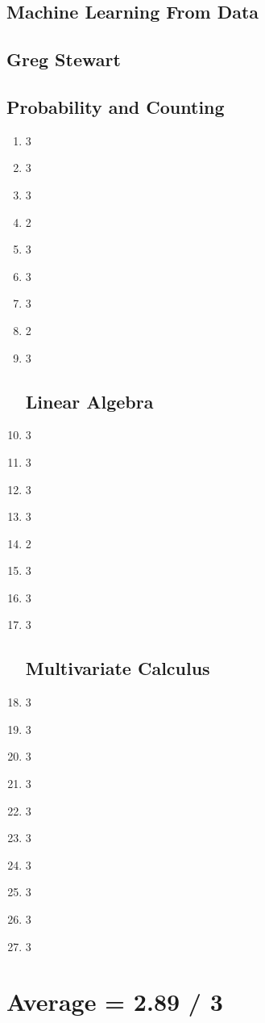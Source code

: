 \documentclass{article}
\begin{document}
\subsection*{Machine Learning From Data}

\subsection*{Greg Stewart}

\subsection*{Probability and Counting}

\begin{enumerate}
  \item 3
  \item 3
  \item 3
  \item 2
  \item 3
  \item 3
  \item 3
  \item 2
  \item 3


\subsection*{Linear Algebra}

  \item 3
  \item 3
  \item 3
  \item 3
  \item 2
  \item 3
  \item 3
  \item 3


\subsection*{Multivariate Calculus}

  \item 3
  \item 3
  \item 3
  \item 3
  \item 3
  \item 3
  \item 3
  \item 3
  \item 3
  \item 3
\end{enumerate}

\section*{Average = 2.89 / 3}
\end{document}

